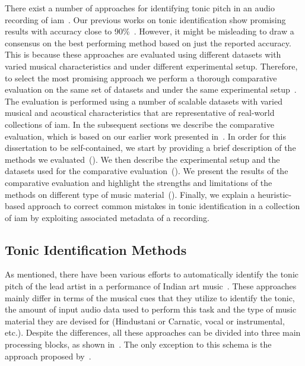 There exist a number of approaches for identifying tonic pitch in an audio recording of \gls{iam}~\citep{salamon2012multipitch,gulati2012two,bellur2012knowledge,ranjani2011carnatic,Sengupta2005b}. Our previous works on tonic identification show promising results with accuracy close to 90\%~\citep{salamon2012multipitch,gulati2012two}. However, it might be misleading to draw a consensus on the best performing method based on just the reported accuracy. This is because these approaches are evaluated using different datasets with varied musical characteristics and under different experimental setup. Therefore, to select the most promising approach we perform a thorough comparative evaluation on the same set of datasets and under the same experimental setup~\citep{Gulati2014Tonic}. The evaluation is performed using a number of scalable datasets with varied musical and acoustical characteristics that are representative of real-world collections of \gls{iam}. In the subsequent sections we describe the comparative evaluation, which is based on our earlier work presented in~\cite{Gulati2014Tonic}. In order for this dissertation to be self-contained, we start by providing a brief description of the methods we evaluated~(). We then describe the experimental setup and the datasets used for the comparative evaluation~(). We present the results of the comparative evaluation and highlight the strengths and limitations of the methods on different type of music material~(). Finally, we explain a heuristic-based approach to correct common mistakes in tonic identification in a collection of \gls{iam} by exploiting associated metadata of a recording. 


\subsection{Tonic Identification Methods}
\label{sec:pre_processing_tonic_identification_methods}

As mentioned, there have been various efforts to automatically identify the tonic pitch of the
lead artist in a performance of Indian art music~\citep{salamon2012multipitch,gulati2012two,bellur2012knowledge,ranjani2011carnatic,Sengupta2005b}.
These approaches mainly differ in terms of the musical cues that they utilize to
identify the tonic, the amount of input audio data used to perform this task and the type
of music material they are devised for (Hindustani or Carnatic, vocal or
instrumental, etc.). Despite the differences, all these approaches can be divided
into three main processing blocks, as shown in~. The only exception to this schema is the approach proposed by~\citep{Sengupta2005b}.

